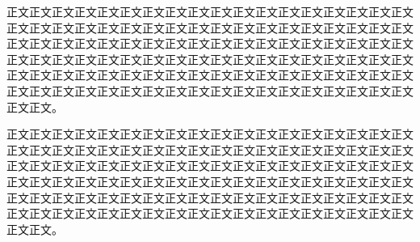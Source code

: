 \begin{enabstract}
正文正文正文正文正文正文正文正文正文正文正文正文正文正文正文正文正文正文正文正文正文正文正文正文正文正文正文正文正文正文正文正文正文正文正文正文正文正文正文正文正文正文正文正文正文正文正文正文正文正文正文正文正文正文正文正文正文正文正文正文正文正文正文正文正文正文正文正文正文正文正文正文正文正文正文正文正文正文正文正文正文正文正文正文正文正文正文正文正文正文正文正文正文正文正文正文正文正文正文正文正文正文正文正文正文正文正文正文正文正文。

正文正文正文正文正文正文正文正文正文正文正文正文正文正文正文正文正文正文正文正文正文正文正文正文正文正文正文正文正文正文正文正文正文正文正文正文正文正文正文正文正文正文正文正文正文正文正文正文正文正文正文正文正文正文正文正文正文正文正文正文正文正文正文正文正文正文正文正文正文正文正文正文正文正文正文正文正文正文正文正文正文正文正文正文正文正文正文正文正文正文正文正文正文正文正文正文正文正文正文正文正文正文正文正文正文正文正文正文正文正文。

\end{enabstract}
